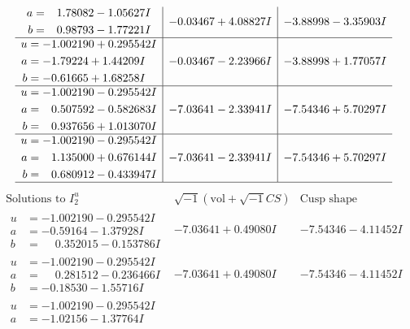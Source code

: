 \documentclass[1p]{elsarticle_modified}
\theoremstyle{definition}
\newcommand{\I}{\sqrt{-1}}
\begin{document}
$$\begin{array}{c|c|c}
\begin{aligned}
a &= \phantom{-}1.78082 - 1.05627 I \\
b &= \phantom{-}0.98793 - 1.77221 I\end{aligned}
 & -0.03467 + 4.08827 I & -3.88998 - 3.35903 I \\ \hline\begin{aligned}
u &= -1.002190 + 0.295542 I \\
a &= -1.79224 + 1.44209 I \\
b &= -0.61665 + 1.68258 I\end{aligned}
 & -0.03467 - 2.23966 I & -3.88998 + 1.77057 I \\ \hline\begin{aligned}
u &= -1.002190 - 0.295542 I \\
a &= \phantom{-}0.507592 - 0.582683 I \\
b &= \phantom{-}0.937656 + 1.013070 I\end{aligned}
 & -7.03641 - 2.33941 I & -7.54346 + 5.70297 I \\ \hline\begin{aligned}
u &= -1.002190 - 0.295542 I \\
a &= \phantom{-}1.135000 + 0.676144 I \\
b &= \phantom{-}0.680912 - 0.433947 I\end{aligned}
 & -7.03641 - 2.33941 I & -7.54346 + 5.70297 I\\
 \hline 
 \end{array}$$\newpage$$\begin{array}{c|c|c}  
\text{Solutions to }I^u_{2}& \I (\text{vol} + \sqrt{-1}CS) & \text{Cusp shape}\\
 \hline 
\begin{aligned}
u &= -1.002190 - 0.295542 I \\
a &= -0.59164 - 1.37928 I \\
b &= \phantom{-}0.352015 - 0.153786 I\end{aligned}
 & -7.03641 + 0.49080 I & -7.54346 - 4.11452 I \\ \hline\begin{aligned}
u &= -1.002190 - 0.295542 I \\
a &= \phantom{-}0.281512 - 0.236466 I \\
b &= -0.18530 - 1.55716 I\end{aligned}
 & -7.03641 + 0.49080 I & -7.54346 - 4.11452 I \\ \hline\begin{aligned}
u &= -1.002190 - 0.295542 I \\
a &= -1.02156 - 1.37764 I \\

\end{aligned}
\end{array}$$
\end{document}
